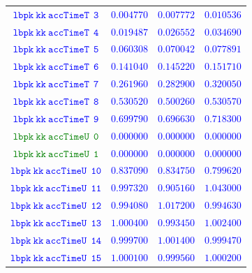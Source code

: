\documentclass[10pt,a4paper]{article}
\begin{document}
\begin{table}[h!]
{\begin{tabular}{cccc}
\textcolor{blue}{$\mathtt{lbpk~kk~accTimeT~~3}$} & \textcolor{blue}{$0.004770$}& \textcolor{blue}{$0.007772$}& \textcolor{blue}{$0.010536$}\\
\textcolor{blue}{$\mathtt{lbpk~kk~accTimeT~~4}$} & \textcolor{blue}{$0.019487$}& \textcolor{blue}{$0.026552$}& \textcolor{blue}{$0.034690$}\\
\textcolor{blue}{$\mathtt{lbpk~kk~accTimeT~~5}$} & \textcolor{blue}{$0.060308$}& \textcolor{blue}{$0.070042$}& \textcolor{blue}{$0.077891$}\\
\textcolor{blue}{$\mathtt{lbpk~kk~accTimeT~~6}$} & \textcolor{blue}{$0.141040$}& \textcolor{blue}{$0.145220$}& \textcolor{blue}{$0.151710$}\\
\textcolor{blue}{$\mathtt{lbpk~kk~accTimeT~~7}$} & \textcolor{blue}{$0.261960$}& \textcolor{blue}{$0.282900$}& \textcolor{blue}{$0.320050$}\\
\textcolor{blue}{$\mathtt{lbpk~kk~accTimeT~~8}$} & \textcolor{blue}{$0.530520$}& \textcolor{blue}{$0.500260$}& \textcolor{blue}{$0.530570$}\\
\textcolor{blue}{$\mathtt{lbpk~kk~accTimeT~~9}$} & \textcolor{blue}{$0.699790$}& \textcolor{blue}{$0.696630$}& \textcolor{blue}{$0.718300$}\\
\textcolor{Green}{$\mathtt{lbpk~kk~accTimeU~~0}$} & \textcolor{blue}{$0.000000$}& \textcolor{blue}{$0.000000$}& \textcolor{blue}{$0.000000$}\\
\textcolor{Green}{$\mathtt{lbpk~kk~accTimeU~~1}$} & \textcolor{blue}{$0.000000$}& \textcolor{blue}{$0.000000$}& \textcolor{blue}{$0.000000$}\\
\textcolor{blue}{$\mathtt{lbpk~kk~accTimeU~~10}$} & \textcolor{blue}{$0.837090$}& \textcolor{blue}{$0.834750$}& \textcolor{blue}{$0.799620$}\\
\textcolor{blue}{$\mathtt{lbpk~kk~accTimeU~~11}$} & \textcolor{blue}{$0.997320$}& \textcolor{blue}{$0.905160$}& \textcolor{blue}{$1.043000$}\\
\textcolor{blue}{$\mathtt{lbpk~kk~accTimeU~~12}$} & \textcolor{blue}{$0.994080$}& \textcolor{blue}{$1.017200$}& \textcolor{blue}{$0.994630$}\\
\textcolor{blue}{$\mathtt{lbpk~kk~accTimeU~~13}$} & \textcolor{blue}{$1.000400$}& \textcolor{blue}{$0.993450$}& \textcolor{blue}{$1.002400$}\\
\textcolor{blue}{$\mathtt{lbpk~kk~accTimeU~~14}$} & \textcolor{blue}{$0.999700$}& \textcolor{blue}{$1.001400$}& \textcolor{blue}{$0.999470$}\\
\textcolor{blue}{$\mathtt{lbpk~kk~accTimeU~~15}$} & \textcolor{blue}{$1.000100$}& \textcolor{blue}{$0.999560$}& \textcolor{blue}{$1.000200$}\\

\end{tabular}}
\end{table}
\end{document}
